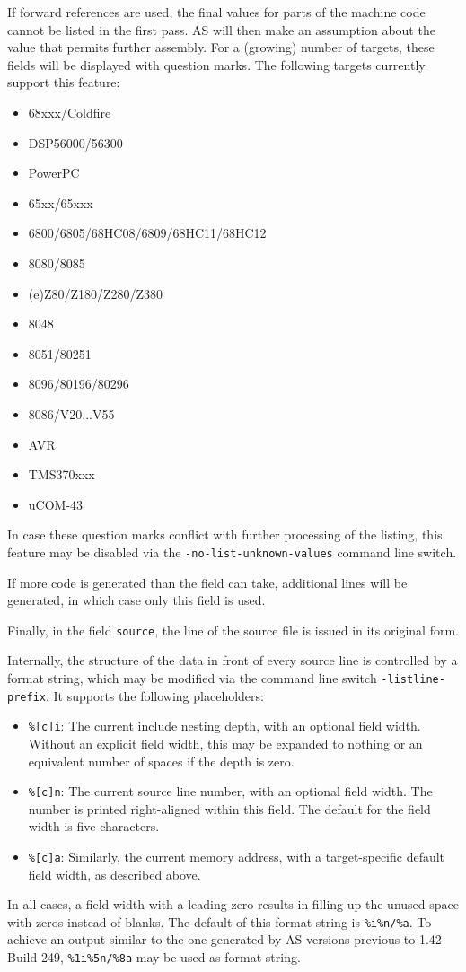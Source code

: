 \documentclass[12pt,twoside]{report}
\newcommand{\tty}[1]{{\tt #1}}
\newcommand{\asname}{{AS}}
\begin{document}
If forward references are used, the final values for parts of the
machine code cannot be listed in the first pass. \asname{} will then
make an assumption about the value that permits further assembly.  For
a (growing) number of targets, these fields will be displayed with
question marks.  The following targets currently support this feature:
\begin{itemize}
\item{68xxx/Coldfire}
\item{DSP56000/56300}
\item{PowerPC}
\item{65xx/65xxx}
\item{6800/6805/68HC08/6809/68HC11/68HC12}
\item{8080/8085}
\item{(e)Z80/Z180/Z280/Z380}
\item{8048}
\item{8051/80251}
\item{8096/80196/80296}
\item{8086/V20...V55}
\item{AVR}
\item{TMS370xxx}
\item{uCOM-43}
\end{itemize}
In case these question marks conflict with further processing of the
listing, this feature may be disabled via the \tty{-no-list-unknown-values}
command line switch.

If more code is generated than the field can take, additional lines
will be  generated, in which case only this field is used.

Finally, in the field \tty{source}, the line of the source file is issued in
its original form.

Internally, the structure of the data in front of every source line
is controlled by a format string, which may be modified via the
command line switch {\tt -listline-prefix}.  It supports the
following placeholders:
\begin{itemize}
\item{{\tt \%[c]i}: The current include nesting depth, with an optional
      field width.  Without an explicit field width, this may be
      expanded to nothing or an equivalent number of spaces if
      the depth is zero.}
\item{{\tt \%[c]n}: The current source line number, with an optional
      field width.  The number is printed right-aligned within
      this field. The default for the field width is five characters.}
\item{{\tt \%[c]a}: Similarly, the current memory address, with a
      target-specific default field width, as described above.}
\end{itemize}
In all cases, a field width with a leading zero results in filling up
the unused space with zeros instead of blanks.  The default of this
format string is \verb!%i%n/%a!.  To achieve an output similar to the
one generated by \asname{} versions previous to 1.42 Build 249,
\verb!%1i%5n/%8a! may be used as format string.
\end{document}
